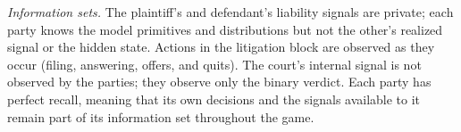 \documentclass{article}
\begin{document}
\emph{Information sets.} The plaintiff’s and defendant’s liability signals are private; each party knows the model primitives and distributions but not the other’s realized signal or the hidden state. Actions in the litigation block are observed as they occur (filing, answering, offers, and quits). The court’s internal signal is not observed by the parties; they observe only the binary verdict. Each party has perfect recall, meaning that its own decisions and the signals available to it remain part of its information set throughout the game. 


\printbibliography
\end{document}

